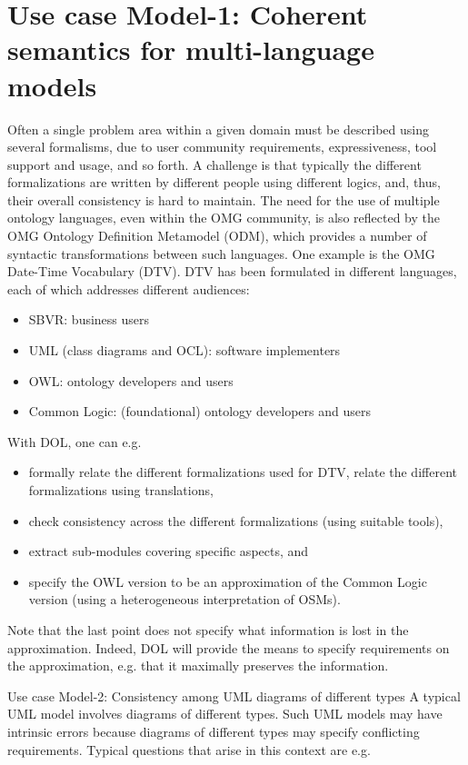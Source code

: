 \documentclass[10pt,%
\ifpretendfinal
final%
\else
draft%
\fi,
]{scrreprt}
\begin{document}
\section{Use case Model-1: Coherent semantics for multi-language models}	
Often a single problem area within a given domain must be described using several formalisms, due to user community requirements, expressiveness, tool support 
and usage, and so forth. A challenge is that typically the different formalizations are written by different people using different logics, and, thus, their overall 
consistency is hard to maintain.
The need for the use of multiple ontology languages, even within the OMG community, is also reflected by the OMG Ontology Definition Metamodel (ODM), which 
provides a number of syntactic transformations between such languages.
One example is the OMG Date-Time Vocabulary (DTV). DTV has been formulated in different languages, each of which addresses different audiences:
\begin{itemize}
\item	 SBVR: business users
\item 	UML (class diagrams and OCL): software implementers
\item 	OWL: ontology developers and users
\item 	Common Logic: (foundational) ontology developers and users
\end{itemize}
With DOL, one can e.g.
\begin{itemize}
\item 	formally relate the different formalizations used for DTV, relate the different formalizations using translations,
\item 	check consistency across the different formalizations (using suitable tools),
\item 	extract sub-modules covering specific aspects, and
\item 	specify the OWL version to be an approximation of the Common Logic version (using a heterogeneous interpretation of OSMs).
\end{itemize}
Note that the last point does not specify what information is lost in the approximation. Indeed, DOL will provide the means to specify requirements on the approximation, e.g. that it maximally preserves the information. 

Use case Model-2: Consistency among UML diagrams of different types
A typical UML model involves diagrams of different types. Such UML models may have intrinsic errors because diagrams of different types may specify conflicting 
requirements. Typical questions that arise in this context are e.g.
\end{document}
